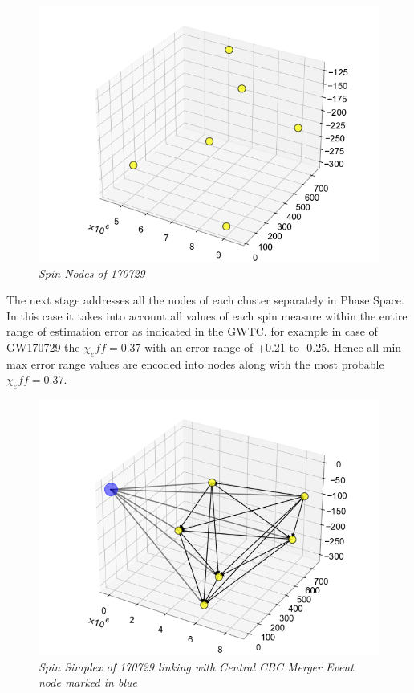     \begin{figure}[H]
        \centering
        \includegraphics[width=1.0\linewidth]{images/65_21_Spin Nodes.png}
        \caption{\textit{Spin Nodes of 170729}}
        \label{fig:LIGO10_PlaceHolder_fig}
    \end{figure}
The next stage addresses all the nodes of each cluster separately in Phase Space. In this case it takes into account all values of each spin measure within the entire range of estimation error as indicated in the GWTC. for example in case of GW170729 the $\chi_eff = 0.37 $ with an error range of +0.21 to -0.25. Hence all min-max error range values are encoded into nodes along with the most probable  $\chi_eff = 0.37 $. 
    \begin{figure}[H]
        \centering
        \includegraphics[width=1.0\linewidth]{images/Spin_Simplex3.png}
        \caption{\textit{Spin Simplex of 170729 linking with Central CBC Merger Event node marked in blue}}
        \label{fig:LIGO11_PlaceHolder_fig}
    \end{figure}

